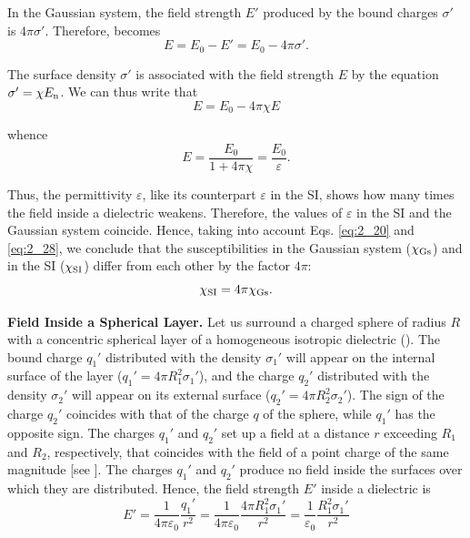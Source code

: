 In the Gaussian system, the field strength $E'$ produced by the bound charges $\sigma'$ is $4\pi\sigma'$. Therefore,  becomes
\begin{equation}\label{eq:2_37}
    E = E_0 - E' = E_0 - 4\pi\sigma'.
\end{equation}

\noindent
The surface density $\sigma'$ is associated with the field strength $E$ by the equation $\sigma'=\chi E_{\text{n}}$. We can thus write that
\begin{equation*}
    E = E_0 - 4\pi\chi E
\end{equation*}

\noindent
whence
\begin{equation*}
    E = \frac{E_0}{1 + 4\pi\chi} = \frac{E_0}{\varepsilon}.
\end{equation*}

\noindent
Thus, the permittivity $\varepsilon$, like its counterpart $\varepsilon$ in the SI, shows how many times the field inside a dielectric weakens. Therefore, the values of $\varepsilon$ in the SI and the Gaussian system coincide. Hence, taking into account Eqs. \eqref{eq:2_20} and \eqref{eq:2_28}, we conclude that the susceptibilities in the Gaussian system ($\chi_{\text{Gs}}$) and in the SI ($\chi_{\text{SI}}$) differ from each other by the factor $4\pi$:
\begin{equation}\label{eq:2_38}
    \chi_{\text{SI}} = 4\pi\chi_{\text{Gs}}.
\end{equation}

\textbf{Field Inside a Spherical Layer.} Let us surround a charged sphere of radius $R$ with a concentric spherical layer of a homogeneous isotropic dielectric (). The bound charge $q_1'$ distributed with the density $\sigma_1'$ will appear on the internal surface of the layer ($q_1'=4\pi R_1^2\sigma_1'$), and the charge $q_2'$ distributed with the density $\sigma_2'$ will appear on its external surface ($q_2'=4\pi R_2^2\sigma_2'$). The sign of the charge $q_2'$ coincides with that of the charge $q$ of the sphere, while $q_1'$ has the opposite sign.
The charges $q_1'$ and $q_2'$ set up a field at a distance $r$ exceeding $R_1$ and $R_2$, respectively, that coincides with the field of a point charge of the same magnitude [see ]. The charges $q_1'$ and $q_2'$ produce no field inside the surfaces over which they are distributed. Hence, the field strength $E'$ inside a dielectric is
\begin{equation*}
    E' = \frac{1}{4\pi\varepsilon_0}\frac{q_1'}{r^2} = \frac{1}{4\pi\varepsilon_0} \frac{4\pi R_1^2\sigma_1'}{r^2} = \frac{1}{\varepsilon_0} \frac{R_1^2 \sigma_1'}{r^2}
\end{equation*}

